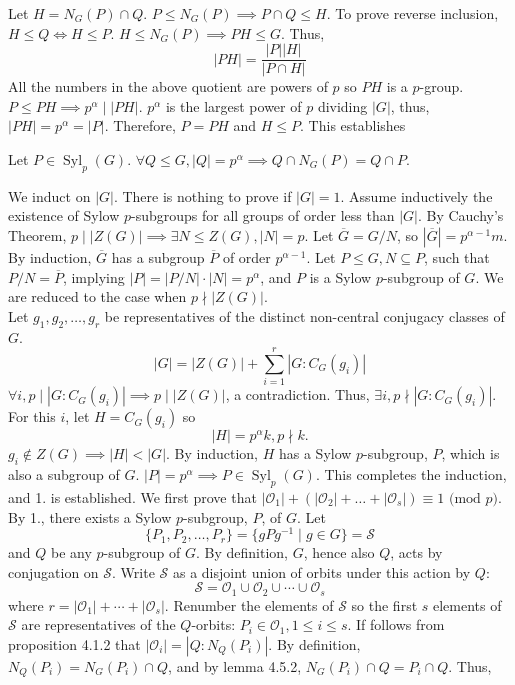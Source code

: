 \documentclass{report}
\newcommand{\mlenma}[2]{\begin{Lenma}{#1}{}#2\end{Lenma}}
\newenvironment{myproof}[1][\proofname]{%
	\proof[\bfseries #1: ]%
}{\endproof}
\DeclareMathOperator{\Syl}{Syl}
\newcommand{\mcO}{\mathcal{O}}	\newcommand{\mcP}{\mathcal{P}}
\newcommand{\mcS}{\mathcal{S}}	\newcommand{\mcT}{\mathcal{T}}
\begin{document}
\begin{myproof}
    Let $H = N_G(P) \cap Q$. $P \leq N_G(P) \implies P \cap Q \leq H$. To prove reverse inclusion, $H \leq Q \iff H \leq P$. $H \leq N_G(P) \implies PH  \leq G$. Thus, 
    $$|PH| = \frac{|P||H|}{|P\cap H|}$$
    All the numbers in the above quotient are powers of $p$ so $PH$ is a $p$-group. $P\leq PH \implies p^\alpha \mid |PH|$. $p^\alpha$ is the largest power of $p$ dividing $|G|$, thus, $|PH| = p^\alpha = |P|$. Therefore, $P = PH$ and $H \leq P$. This establishes
    \mlenma{}{Let $P \in \Syl_p(G)$. $\forall Q \leq G, |Q| = p^\alpha \implies Q\cap N_G(P) = Q \cap P$. }
    We induct on $|G|$. There is nothing to prove if $|G| =1$. Assume inductively the existence of Sylow $p$-subgroups for all groups of order less than $|G|$. By Cauchy's Theorem, $p\mid |Z(G)| \implies \exists N \leq Z(G), |N| = p$. Let $\overline G = G/N$, so $| \overline G | = p^{\alpha -1}m$. By induction, $\overline G$ has a subgroup $\overline P$ of order $p^{\alpha-1}$. Let $P \leq G, N \subseteq P$, such that $P/N = \overline P$, implying $|P| = |P/N| \cdot |N| = p^\alpha$, and $P$ is a Sylow $p$-subgroup of $G$. We are reduced to the case when $p \nmid |Z(G)|$. \\
    Let $g_1, g_2, \dots, g_r$ be representatives of the distinct non-central conjugacy classes of $G$. 
    $$|G| = |Z(G)| + \sum_{i=1}^r |G: C_G(g_i)|$$
    $\forall i, p \mid |G: C_G(g_i)| \implies p \mid |Z(G)|$, a contradiction. Thus, $\exists i, p \nmid |G: C_G(g_i)|$. For this $i$, let $H = C_G(g_i)$ so
    $$|H| = p^\alpha k, p \nmid k.$$
    $g_i \notin Z(G) \implies |H| < |G|$. By induction, $H$ has a Sylow $p$-subgroup, $P$, which is also a subgroup of $G$. $|P| = p^\alpha \implies P \in \Syl_p(G)$. This completes the induction, and 1. is established. 
    We first prove that $|\mcO_1| + (|\mcO_2 | + \dots + |\mcO_s|) \equiv 1 \text{ (mod }p)$. By 1., there exists a Sylow $p$-subgroup, $P$, of $G$. Let 
    $$\{P_1, P_2, \dots, P_r \} = \{gPg^{-1} \mid g \in G \} = \mcS$$
    and $Q$ be any $p$-subgroup of $G$. By definition, $G$, hence also $Q$, acts by conjugation on $\mcS$. Write $\mcS$ as a disjoint union of orbits under this action by $Q$:
    $$\mcS = \mcO_1 \cup \mcO_2 \cup \cdots \cup \mcO_s$$
    where $r = |\mcO_1| + \cdots + |\mcO_s|$. Renumber the elements of $\mcS$ so the first $s$ elements of $\mcS$ are representatives of the $Q$-orbits: $P_i \in \mcO_1, 1 \leq i \leq s$. If follows from proposition 4.1.2 that $|\mcO_i| = |Q: N_Q(P_i)|$. By definition, $N_Q(P_i) = N_G(P_i) \cap Q$, and by lemma 4.5.2, $N_G(P_i) \cap Q = P_i \cap Q$. Thus, 

\end{myproof}
\end{document}

